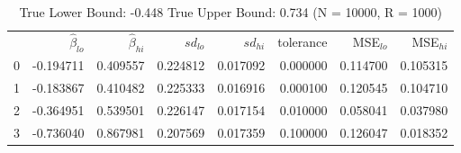 \begin{table}
\caption{True Lower Bound: -0.448 True Upper Bound: 0.734 (N = 10000, R = 1000)}
\begin{tabular}{lrrrrrrr}
 & $\hat{\beta}_{lo}$ & $\hat{\beta}_{hi}$ & $sd_{lo}$ & $sd_{hi}$ & tolerance & MSE$_{lo}$ & MSE$_{hi}$ \\
0 & -0.194711 & 0.409557 & 0.224812 & 0.017092 & 0.000000 & 0.114700 & 0.105315 \\
1 & -0.183867 & 0.410482 & 0.225333 & 0.016916 & 0.000100 & 0.120545 & 0.104710 \\
2 & -0.364951 & 0.539501 & 0.226147 & 0.017154 & 0.010000 & 0.058041 & 0.037980 \\
3 & -0.736040 & 0.867981 & 0.207569 & 0.017359 & 0.100000 & 0.126047 & 0.018352 \\
\end{tabular}
\end{table}
